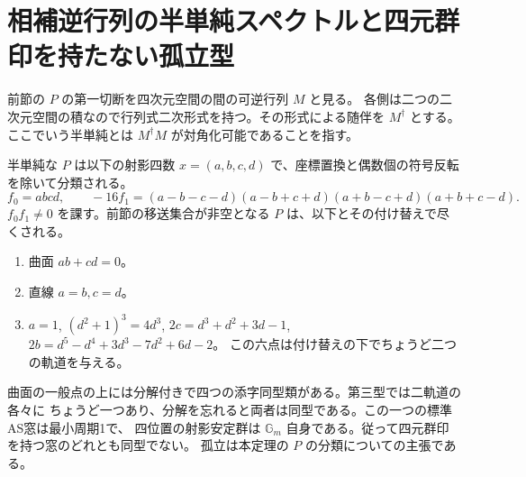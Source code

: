 \section{相補逆行列の半単純スペクトルと四元群印を持たない孤立型}
\label{sec:split-bell-locus}
前節の $P$ の第一切断を四次元空間の間の可逆行列 $M$ と見る。
各側は二つの二次元空間の積なので行列式二次形式を持つ。その形式による随伴を $M^\dagger$ とする。
ここでいう半単純とは $M^\dagger M$ が対角化可能であることを指す。
\begin{theorem}\label{thm:split-bell-locus}
半単純な $P$ は以下の射影四数 $x=(a,b,c,d)$ で、座標置換と偶数個の符号反転を除いて分類される。
\[
  f_0=abcd,\qquad
  -16 f_1=(a-b-c-d)(a-b+c+d)(a+b-c+d)(a+b+c-d).
\]
$f_0f_1\ne0$ を課す。前節の移送集合が非空となる $P$ は、以下とその付け替えで尽くされる。
\begin{enumerate}
\item 曲面 $ab+cd=0$。
\item 直線 $a=b,c=d$。
\item $a=1$, $(d^2+1)^3=4d^3$,
$2c=d^3+d^2+3d-1$, $2b=d^5-d^4+3d^3-7d^2+6d-2$。
この六点は付け替えの下でちょうど二つの軌道を与える。
\end{enumerate}
曲面の一般点の上には分解付きで四つの添字同型類がある。第三型では二軌道の各々に
ちょうど一つあり、分解を忘れると両者は同型である。この一つの標準AS窓は最小周期1で、
四位置の射影安定群は $\mathbb G_m$ 自身である。従って四元群印を持つ窓のどれとも同型でない。
孤立は本定理の $P$ の分類についての主張である。
\end{theorem}
